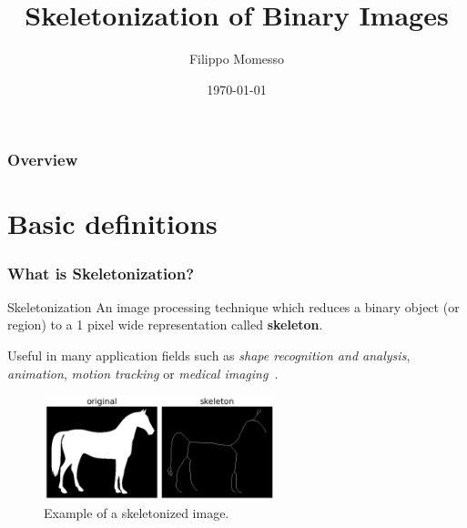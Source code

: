 \documentclass[9pt, t]{beamer}
\title[Signal Image \& Video]{Skeletonization of Binary Images} %
\author{Filippo Momesso} %
\institute[UniTN] %
{
University of Trento \\ %
\medskip
\textit{filippo.momesso@studenti.unitn.it} %
}
\date{\today} %
\begin{document}
\begin{frame}
  \titlepage %
\end{frame}

\begin{frame}
  \frametitle{Overview} %
  \tableofcontents %
\end{frame}


\section{Basic definitions}
\begin{frame}
  \frametitle{What is Skeletonization?}
  \begin{block}{Skeletonization}
    An image processing technique which reduces a binary object (or region) to a 1 pixel wide representation called \textbf{skeleton}.
  \end{block}
  Useful in many application fields such as \emph{shape recognition and analysis}, \emph{animation}, \emph{motion tracking} or \emph{medical imaging}~\cite{skel-applications}.
  \begin{figure}
    \begin{center}
      \includegraphics[width=0.6\textwidth]{skeletonization-example.png}
      \caption{Example of a skeletonized image.}
    \end{center}
  \end{figure}
\end{frame}
\end{document}
